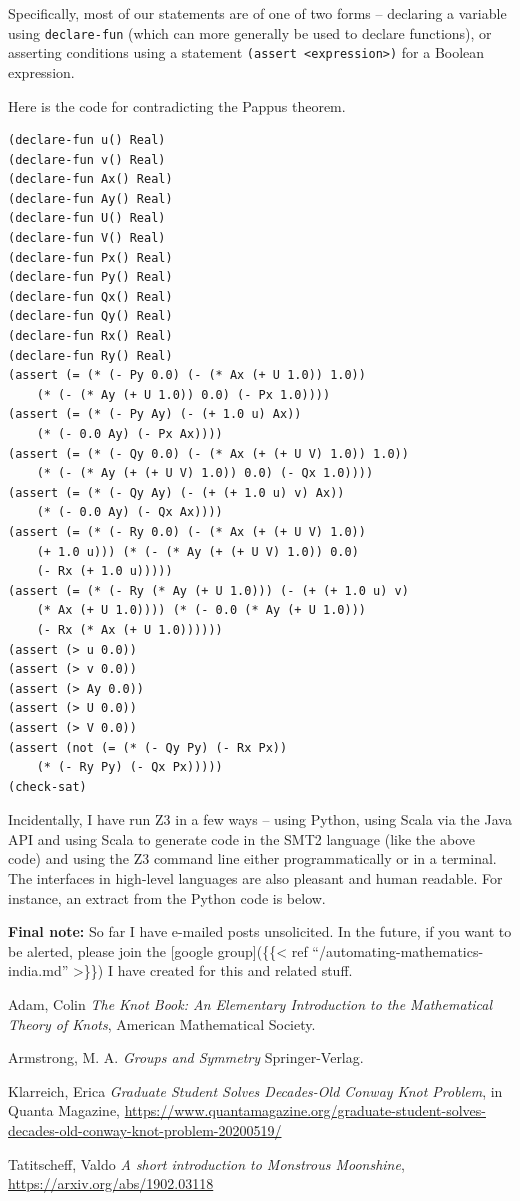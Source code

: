 \documentclass{amsart}
\theoremstyle{plain}
\theoremstyle{definition}
\theoremstyle{remark}
\begin{document}
Specifically, most of our statements are of one of two forms --
declaring a variable using \texttt{declare-fun} (which can more
generally be used to declare functions), or asserting conditions using a
statement \texttt{(assert\ \textless{}expression\textgreater{})} for a
Boolean expression.

Here is the code for contradicting the Pappus theorem.

\begin{lstlisting}[language=LISP, frame=single]
(declare-fun u() Real)
(declare-fun v() Real)
(declare-fun Ax() Real)
(declare-fun Ay() Real)
(declare-fun U() Real)
(declare-fun V() Real)
(declare-fun Px() Real)
(declare-fun Py() Real)
(declare-fun Qx() Real)
(declare-fun Qy() Real)
(declare-fun Rx() Real)
(declare-fun Ry() Real)
(assert (= (* (- Py 0.0) (- (* Ax (+ U 1.0)) 1.0)) 
	(* (- (* Ay (+ U 1.0)) 0.0) (- Px 1.0))))
(assert (= (* (- Py Ay) (- (+ 1.0 u) Ax)) 
	(* (- 0.0 Ay) (- Px Ax))))
(assert (= (* (- Qy 0.0) (- (* Ax (+ (+ U V) 1.0)) 1.0)) 
	(* (- (* Ay (+ (+ U V) 1.0)) 0.0) (- Qx 1.0))))
(assert (= (* (- Qy Ay) (- (+ (+ 1.0 u) v) Ax)) 
	(* (- 0.0 Ay) (- Qx Ax))))
(assert (= (* (- Ry 0.0) (- (* Ax (+ (+ U V) 1.0)) 
	(+ 1.0 u))) (* (- (* Ay (+ (+ U V) 1.0)) 0.0) 
	(- Rx (+ 1.0 u)))))
(assert (= (* (- Ry (* Ay (+ U 1.0))) (- (+ (+ 1.0 u) v) 
	(* Ax (+ U 1.0)))) (* (- 0.0 (* Ay (+ U 1.0))) 
	(- Rx (* Ax (+ U 1.0))))))
(assert (> u 0.0))
(assert (> v 0.0))
(assert (> Ay 0.0))
(assert (> U 0.0))
(assert (> V 0.0))
(assert (not (= (* (- Qy Py) (- Rx Px)) 
	(* (- Ry Py) (- Qx Px)))))
(check-sat)
\end{lstlisting}


Incidentally, I have run Z3 in a few ways -- using Python, using Scala
via the Java API and using Scala to generate code in the SMT2 language
(like the above code) and using the Z3 command line either
programmatically or in a terminal. The interfaces in high-level
languages are also pleasant and human readable. For instance, an extract
from the Python code is below.


\textbf{Final note:} So far I have e-mailed posts unsolicited. In the
future, if you want to be alerted, please join the {[}google
group{]}(\{\{\textless{} ref ``/automating-mathematics-india.md''
\textgreater{}\}\}) I have created for this and related stuff.


\begin{thebibliography}{10}

	 Adam, Colin
	\textit{The Knot Book: An Elementary Introduction to the Mathematical Theory of Knots},
	American Mathematical Society.

	 Armstrong, M. A.
	\textit{Groups and Symmetry} Springer-Verlag.

	 Klarreich, Erica
	\textit{Graduate Student Solves Decades-Old Conway Knot Problem}, in Quanta Magazine, \newline
	{\url{https://www.quantamagazine.org/graduate-student-solves-decades-old-conway-knot-problem-20200519/}}

	 Tatitscheff, Valdo
	\textit{A short introduction to Monstrous Moonshine},
	\url{https://arxiv.org/abs/1902.03118}


\end{thebibliography} 
\end{document}

